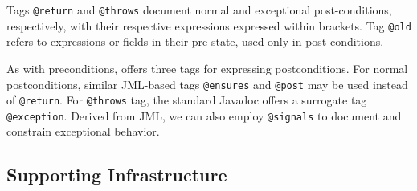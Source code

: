 Tags \lstinline!@return! and \lstinline!@throws! document normal and exceptional post-conditions, respectively, with their respective expressions
expressed within brackets.
Tag \lstinline!@old! refers to expressions or fields in their pre-state, used only in post-conditions.

As with preconditions, \contractjdoc{} offers three tags for expressing postconditions.
For normal postconditions, similar JML-based tags \lstinline!@ensures! and \lstinline!@post! may be used instead of \lstinline!@return!.
For \lstinline!@throws! tag, the standard Javadoc offers a surrogate tag \lstinline!@exception!. 
Derived from JML, we can also employ \lstinline!@signals! to document and constrain exceptional behavior.



\subsection{Supporting Infrastructure}

